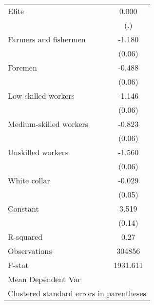 {\begin{tabular}{l*{1}{c}}
Elite               &       0.000         \\
                    &         (.)         \\
Farmers and fishermen&      -1.180\sym{***}\\
                    &      (0.06)         \\
Foremen             &      -0.488\sym{***}\\
                    &      (0.06)         \\
Low-skilled workers &      -1.146\sym{***}\\
                    &      (0.06)         \\
Medium-skilled workers&      -0.823\sym{***}\\
                    &      (0.06)         \\
Unskilled workers   &      -1.560\sym{***}\\
                    &      (0.06)         \\
White collar        &      -0.029         \\
                    &      (0.05)         \\
Constant            &       3.519\sym{***}\\
                    &      (0.14)         \\
\hline
R-squared           &        0.27         \\
Observations        &      304856         \\
F-stat              &    1931.611         \\
Mean Dependent Var  &                     \\
\hline\hline
\multicolumn{2}{l}{\footnotesize Clustered standard errors in parentheses}\\
\end{tabular}
}
